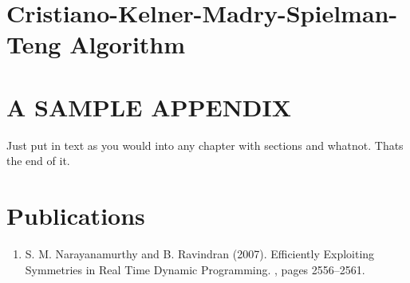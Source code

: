 \documentclass[BTech]{iitmdiss}
\begin{document}
	 \chapter{Cristiano-Kelner-Madry-Spielman-Teng Algorithm}
	 
	 
	
    \chapter{A SAMPLE APPENDIX}
 
 Just put in text as you would into any chapter with sections and
 whatnot.  Thats the end of it.


\chapter*{Publications}
\vspace{-0.3cm}

\begin{enumerate}
\item S. M. Narayanamurthy and B. Ravindran (2007). \newblock
  Efficiently Exploiting Symmetries in Real Time Dynamic Programming. , pages 2556--2561.
\end{enumerate}


\pagebreak
\begin{singlespace}
  \begin{small}
	
  \end{small}
\end{singlespace}

\end{document}
